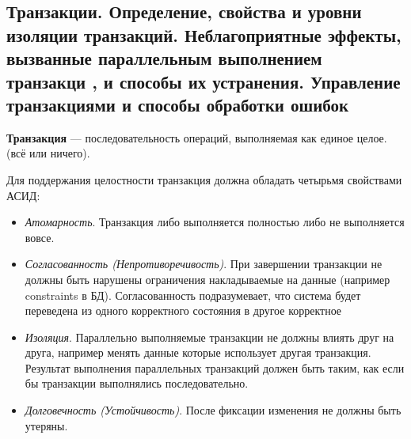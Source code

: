 \newpage

\subsection{Транзакции. Определение, свойства и уровни изоляции транзакций. Неблагоприятные эффекты, вызванные параллельным выполнением транзакци , и способы их устранения. Управление транзакциями и способы обработки ошибок}

\textbf{Транзакция} --- последовательность операций, выполняемая как единое целое. (всё или ничего).

Для поддержания целостности транзакция должна обладать четырьмя свойствами АСИД:
\begin{itemize}
	\item \textit{Атомарность}. Транзакция либо выполняется полностью либо не выполняется вовсе.
	\item \textit{Согласованность (Непротиворечивость)}. При завершении транзакции не должны быть нарушены ограничения накладываемые на данные (например constraints в БД). Согласованность подразумевает, что система будет переведена из одного корректного состояния в другое корректное
	\item \textit{Изоляция}. Параллельно выполняемые транзакции не должны влиять друг на друга,
	например менять данные которые использует другая транзакция. Результат выполнения параллельных транзакций должен быть таким, как если бы транзакции выполнялись последовательно.
	\item \textit{Долговечность (Устойчивость)}. После фиксации изменения не должны быть утеряны.
\end{itemize}

